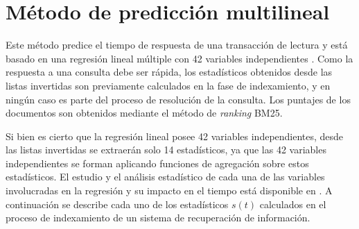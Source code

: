 \section{Método de predicción multilineal}
\label{scheduling:glasgow}
Este método predice el tiempo de respuesta de una transacción de lectura y está basado en una regresión lineal múltiple con 42 variables independientes \citep{Macdonald:2012}. Como la respuesta a una consulta debe ser rápida, los estadísticos obtenidos desde las listas invertidas son previamente calculados en la fase de indexamiento, y en ningún caso es parte del proceso de resolución de la consulta. Los puntajes de los documentos son obtenidos mediante el método de \textit{ranking} BM25. 

Si bien es cierto que la regresión lineal posee 42 variables independientes, desde las listas invertidas se extraerán solo 14 estadísticos, ya que las 42 variables independientes se forman aplicando funciones de agregación sobre estos estadísticos. El estudio y el análisis estadístico de cada una de las variables involucradas en la regresión y su impacto en el tiempo está disponible en \citep{Macdonald:2012, Hauff:2010, He:2004}. A continuación se describe cada uno de los estadísticos $s(t)$ calculados en el proceso de indexamiento \citep{Croft:2009} de un sistema de recuperación de información.


